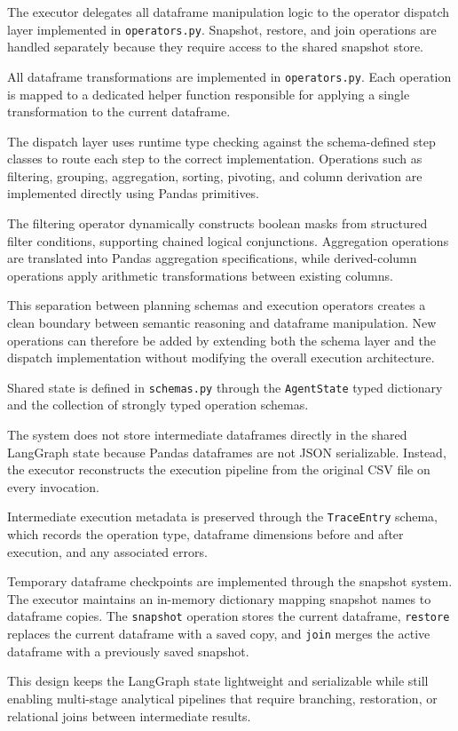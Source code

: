 The executor delegates all dataframe manipulation logic to the operator dispatch layer implemented in \texttt{operators.py}. Snapshot, restore, and join operations are handled separately because they require access to the shared snapshot store.


All dataframe transformations are implemented in \texttt{operators.py}. Each operation is mapped to a dedicated helper function responsible for applying a single transformation to the current dataframe.

The dispatch layer uses runtime type checking against the schema-defined step classes to route each step to the correct implementation. Operations such as filtering, grouping, aggregation, sorting, pivoting, and column derivation are implemented directly using Pandas primitives.

The filtering operator dynamically constructs boolean masks from structured filter conditions, supporting chained logical conjunctions. Aggregation operations are translated into Pandas aggregation specifications, while derived-column operations apply arithmetic transformations between existing columns.

This separation between planning schemas and execution operators creates a clean boundary between semantic reasoning and dataframe manipulation. New operations can therefore be added by extending both the schema layer and the dispatch implementation without modifying the overall execution architecture.


Shared state is defined in \texttt{schemas.py} through the \texttt{AgentState} typed dictionary and the collection of strongly typed operation schemas.

The system does not store intermediate dataframes directly in the shared LangGraph state because Pandas dataframes are not JSON serializable. Instead, the executor reconstructs the execution pipeline from the original CSV file on every invocation.

Intermediate execution metadata is preserved through the \texttt{TraceEntry} schema, which records the operation type, dataframe dimensions before and after execution, and any associated errors.

Temporary dataframe checkpoints are implemented through the snapshot system. The executor maintains an in-memory dictionary mapping snapshot names to dataframe copies. The \texttt{snapshot} operation stores the current dataframe, \texttt{restore} replaces the current dataframe with a saved copy, and \texttt{join} merges the active dataframe with a previously saved snapshot.

This design keeps the LangGraph state lightweight and serializable while still enabling multi-stage analytical pipelines that require branching, restoration, or relational joins between intermediate results.
